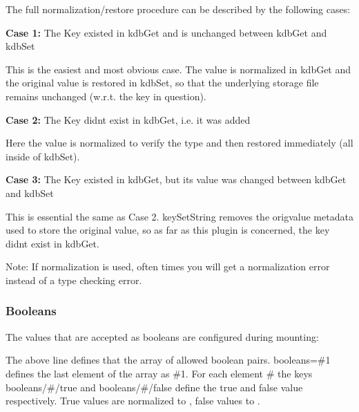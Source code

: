The full normalization/restore procedure can be described by the following cases\+:


\begin{DoxyItemize}
\item {\bfseries Case 1\+:} The Key existed in kdb\+Get and is unchanged between {\ttfamily kdb\+Get} and {\ttfamily kdb\+Set}

This is the easiest and most obvious case. The value is normalized in {\ttfamily kdb\+Get} and the original value is restored in {\ttfamily kdb\+Set}, so that the underlying storage file remains unchanged (w.\+r.\+t. the key in question).
\item {\bfseries Case 2\+:} The Key didn\textquotesingle{}t exist in {\ttfamily kdb\+Get}, i.\+e. it was added

Here the value is normalized to verify the type and then restored immediately (all inside of {\ttfamily kdb\+Set}).
\item {\bfseries Case 3\+:} The Key existed in {\ttfamily kdb\+Get}, but its value was changed between kdb\+Get and kdb\+Set

This is essential the same as Case 2. {\ttfamily key\+Set\+String} removes the {\ttfamily origvalue} metadata used to store the original value, so as far as this plugin is concerned, the key didn\textquotesingle{}t exist in {\ttfamily kdb\+Get}.
\end{DoxyItemize}

Note\+: If normalization is used, often times you will get a normalization error instead of a type checking error.

\subsubsection*{Booleans}

The values that are accepted as {\ttfamily boolean}s are configured during mounting\+:




The above line defines that the array of allowed boolean pairs. {\ttfamily booleans=\#1} defines the last element of the array as {\ttfamily \#1}. For each element {\ttfamily \#} the keys {\ttfamily booleans/\#/true} and {\ttfamily booleans/\#/false} define the true and false value respectively. True values are normalized to {}, false values to {}.


